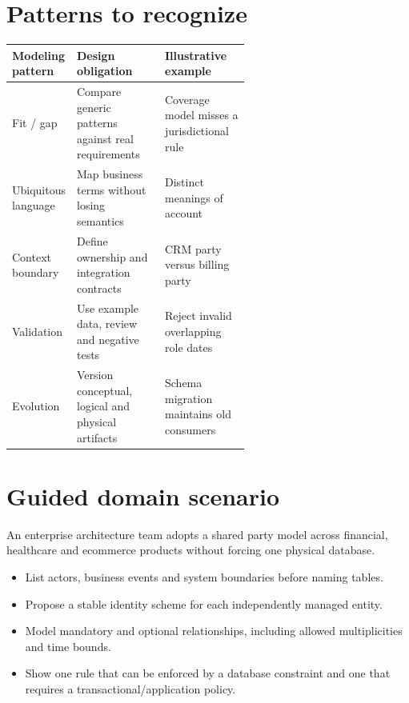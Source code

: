 \documentclass[11pt,letterpaper]{article}
\begin{document}
\section{Patterns to recognize}
\begin{tabularx}{\linewidth}{@{}>{\raggedright\arraybackslash}p{0.22\linewidth} >{\raggedright\arraybackslash}p{0.37\linewidth}>{\raggedright\arraybackslash}X@{}}
\toprule
\textbf{Modeling pattern} & \textbf{Design obligation} & \textbf{Illustrative example} \\ 
\midrule
Fit / gap & Compare generic patterns against real requirements & Coverage model misses a jurisdictional rule \\ 
Ubiquitous language & Map business terms without losing semantics & Distinct meanings of account \\ 
Context boundary & Define ownership and integration contracts & CRM party versus billing party \\ 
Validation & Use example data, review and negative tests & Reject invalid overlapping role dates \\ 
Evolution & Version conceptual, logical and physical artifacts & Schema migration maintains old consumers \\ 
\bottomrule
\end{tabularx}

\section{Guided domain scenario}
An enterprise architecture team adopts a shared party model across financial, healthcare and ecommerce products without forcing one physical database.

\begin{itemize}
\item List actors, business events and system boundaries before naming tables.
\item Propose a stable identity scheme for each independently managed entity.
\item Model mandatory and optional relationships, including allowed multiplicities and time bounds.
\item Show one rule that can be enforced by a database constraint and one that requires a transactional/application policy.
\end{itemize}
\end{document}
